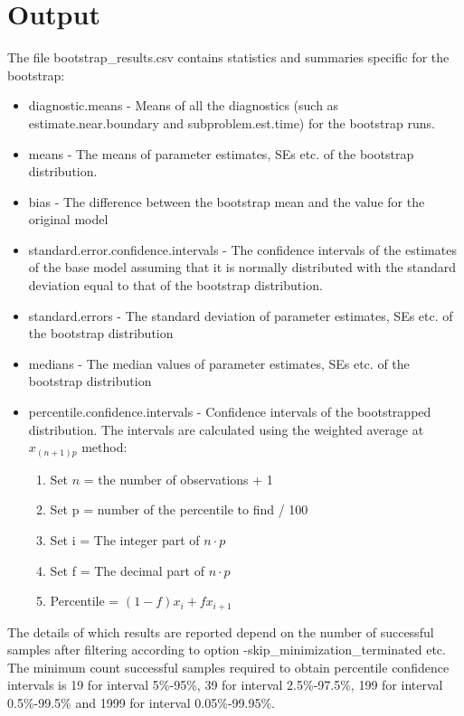 \section{Output}
The file bootstrap\_results.csv contains statistics and summaries specific for the bootstrap:
\begin{itemize}
    \item diagnostic.means - Means of all the diagnostics (such as estimate.near.boundary and subproblem.est.time) for the bootstrap runs.
    \item means - The means of parameter estimates, SEs etc. of the bootstrap distribution.
    \item bias - The difference between the bootstrap mean and the value for the original model
    \item standard.error.confidence.intervals - The confidence intervals of the estimates of the base model assuming that it is normally distributed with the standard deviation equal to that of the bootstrap distribution. 
    \item standard.errors - The standard deviation of parameter estimates, SEs etc. of the bootstrap distribution
    \item medians - The median values of parameter estimates, SEs etc. of the bootstrap distribution
    \item percentile.confidence.intervals - Confidence intervals of the bootstrapped distribution. The intervals are calculated using the weighted average at $x_{(n+1)p}$ method:
    \begin{enumerate}
        \item Set $n$ = the number of observations + 1
        \item Set p = number of the percentile to find / 100
        \item Set i = The integer part of $n\cdot p$
        \item Set f = The decimal part of $n\cdot p$
        \item Percentile = $(1-f)x_i + fx_{i+1}$
    \end{enumerate}
\end{itemize}

The details of which results are reported depend on the number of successful samples after filtering according to
option -skip\_minimization\_terminated etc. The minimum count successful samples required to obtain
percentile confidence intervals is %
19 for interval 5\%-95\%, 39 for interval 2.5\%-97.5\%, 199 for interval 0.5\%-99.5\% and 1999 for interval 0.05\%-99.95\%.

